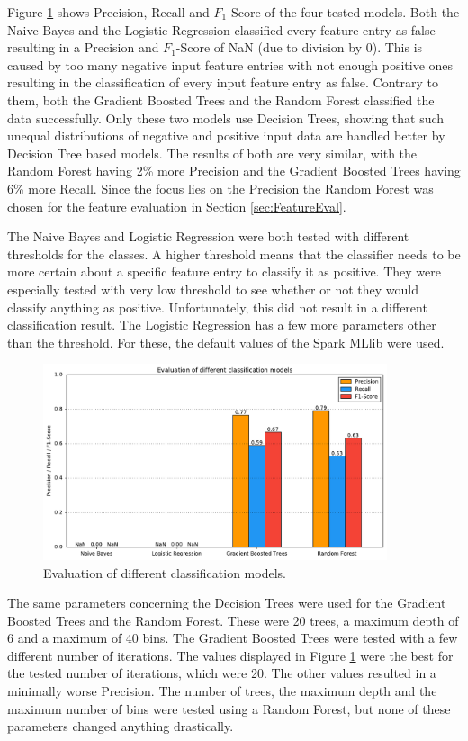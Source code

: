 Figure \ref{classifier_eval} shows Precision, Recall and $F_1$-Score of the four tested models. Both the Naive Bayes and the Logistic Regression classified every feature entry as false resulting in a Precision and $F_1$-Score of NaN (due to division by 0). This is caused by too many negative input feature entries with not enough positive ones resulting in the classification of every input feature entry as false. Contrary to them, both the Gradient Boosted Trees and the Random Forest classified the data successfully. Only these two models use Decision Trees, showing that such unequal distributions of negative and positive input data are handled better by Decision Tree based models. The results of both are very similar, with the Random Forest having 2\% more Precision and the Gradient Boosted Trees having 6\% more Recall. Since the focus lies on the Precision the Random Forest was chosen for the feature evaluation in Section \ref{sec:FeatureEval}.\par
The Naive Bayes and Logistic Regression were both tested with different thresholds for the classes. A higher threshold means that the classifier needs to be more certain about a specific feature entry to classify it as positive. They were especially tested with very low threshold to see whether or not they would classify anything as positive. Unfortunately, this did not result in a different classification result. The Logistic Regression has a few more parameters other than the threshold. For these, the default values of the Spark MLlib were used.\par
\begin{figure}[H]
	\centering
	\includegraphics[width=0.9\textwidth]{img/classifier_eval}
	\caption{Evaluation of different classification models.}
	\label{classifier_eval}
\end{figure}
The same parameters concerning the Decision Trees were used for the Gradient Boosted Trees and the Random Forest. These were 20 trees, a maximum depth of 6 and a maximum of 40 bins. The Gradient Boosted Trees were tested with a few different number of iterations. The values displayed in Figure \ref{classifier_eval} were the best for the tested number of iterations, which were 20. The other values resulted in a minimally worse Precision. The number of trees, the maximum depth and the maximum number of bins were tested using a Random Forest, but none of these parameters changed anything drastically.\par
